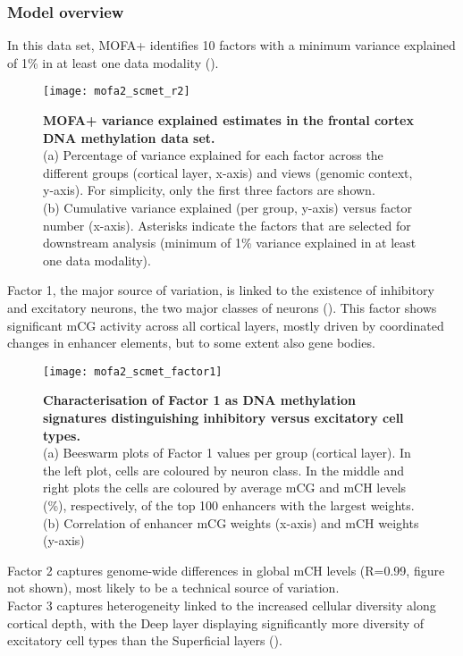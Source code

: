 \subsubsection{Model overview}

In this data set, MOFA+ identifies 10 factors with a minimum variance explained of 1\% in at least one data modality ().

\begin{figure}[H]
	\centering
	\texttt{[image: mofa2\_scmet\_r2]}
	\caption[]{
	\textbf{MOFA+ variance explained estimates in the frontal cortex DNA methylation data set.} \\
	(a) Percentage of variance explained for each factor across the different groups (cortical layer, x-axis) and views (genomic context, y-axis). For simplicity, only the first three factors are shown. \\
	(b) Cumulative variance explained (per group, y-axis) versus factor number (x-axis). Asterisks indicate the factors that are selected for downstream analysis (minimum of 1\% variance explained in at least one data modality).
	}
	\label{fig:mofa2_scmet_r2}
\end{figure}

Factor 1, the major source of variation, is linked to the existence of inhibitory and excitatory neurons, the two major classes of neurons (). This factor shows significant mCG activity across all cortical layers, mostly driven by coordinated changes in enhancer elements, but to some extent also gene bodies.

\begin{figure}[H]
	\centering
	\texttt{[image: mofa2\_scmet\_factor1]}
	\caption[]{
	\textbf{Characterisation of Factor 1 as DNA methylation signatures distinguishing inhibitory versus excitatory cell types\cite{Luo2017}.} \\
	(a) Beeswarm plots of Factor 1 values per group (cortical layer). In the left plot, cells are coloured by neuron class. In the middle and right plots the cells are coloured by average mCG and mCH levels (\%), respectively, of the top 100 enhancers with the largest weights. \\
	(b) Correlation of enhancer mCG weights (x-axis) and mCH weights (y-axis)
	}
	\label{fig:mofa2_scmet_factor1}
\end{figure}

Factor 2 captures genome-wide differences in global mCH levels (R=0.99, figure not shown), most likely to be a technical source of variation.\\
Factor 3 captures heterogeneity linked to the increased cellular diversity along cortical depth, with the Deep layer displaying significantly more diversity of excitatory cell types than the Superficial layers ().  

